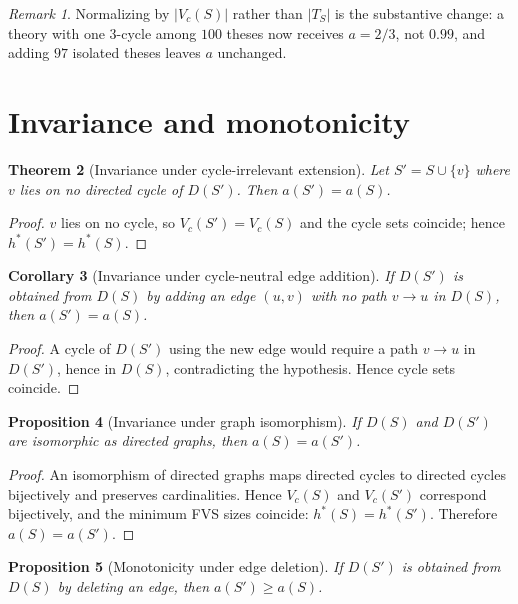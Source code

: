 \documentclass[11pt]{article}
\newtheorem{theorem}{Theorem}[section]
\newtheorem{proposition}[theorem]{Proposition}
\newtheorem{corollary}[theorem]{Corollary}
\theoremstyle{definition}
\theoremstyle{remark}
\newtheorem{remark}[theorem]{Remark}
\begin{document}
\begin{remark}
Normalizing by $|V_c(S)|$ rather than $|T_S|$ is the substantive change: a theory with one $3$-cycle among $100$ theses now receives $a=2/3$, not $0.99$, and adding $97$ isolated theses leaves $a$ unchanged.
\end{remark}

\section{Invariance and monotonicity}\label{sec:inv}

\begin{theorem}[Invariance under cycle-irrelevant extension]\label{thm:inv}
Let $S'=S\cup\{v\}$ where $v$ lies on no directed cycle of $D(S')$. Then $a(S')=a(S)$.
\end{theorem}

\begin{proof}
$v$ lies on no cycle, so $V_c(S')=V_c(S)$ and the cycle sets coincide; hence $h^*(S')=h^*(S)$.
\end{proof}

\begin{corollary}[Invariance under cycle-neutral edge addition]\label{cor:trans}
If $D(S')$ is obtained from $D(S)$ by adding an edge $(u,v)$ with no path $v\to u$ in $D(S)$, then $a(S')=a(S)$.
\end{corollary}

\begin{proof}
A cycle of $D(S')$ using the new edge would require a path $v\to u$ in $D(S')$, hence in $D(S)$, contradicting the hypothesis. Hence cycle sets coincide.
\end{proof}

\begin{proposition}[Invariance under graph isomorphism]\label{prop:iso}
If $D(S)$ and $D(S')$ are isomorphic as directed graphs, then $a(S)=a(S')$.
\end{proposition}

\begin{proof}
An isomorphism of directed graphs maps directed cycles to directed cycles bijectively and preserves cardinalities. Hence $V_c(S)$ and $V_c(S')$ correspond bijectively, and the minimum FVS sizes coincide: $h^*(S)=h^*(S')$. Therefore $a(S)=a(S')$.
\end{proof}

\begin{proposition}[Monotonicity under edge deletion]\label{prop:mono-edge}
If $D(S')$ is obtained from $D(S)$ by deleting an edge, then $a(S')\ge a(S)$.
\end{proposition}
\end{document}
